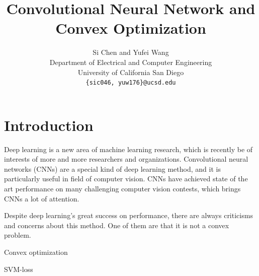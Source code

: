 \documentclass{article} %
\title{Convolutional Neural Network and Convex Optimization}
\author{
Si Chen  and   Yufei Wang\\
Department of Electrical and Computer Engineering\\
University of California San Diego\\
\texttt{\{sic046, yuw176\}@ucsd.edu}          \\
}
\begin{document}
\maketitle
\begin{abstract}

\end{abstract}
\section{Introduction}

Deep learning is a new area of machine learning research, which is recently be of interests of more and more researchers and organizations. Convolutional neural networks (CNNs) are a special kind of deep learning method, and it is particularly useful in field of computer vision. CNNs have achieved state of the art performance on many challenging computer vision contests, which brings CNNs a lot of attention.
\par
Despite deep learning's great success on performance, there are always criticisms and concerns about this method. One of them are that it is not a convex problem. 


Convex optimization


SVM-loss
\end{document}
